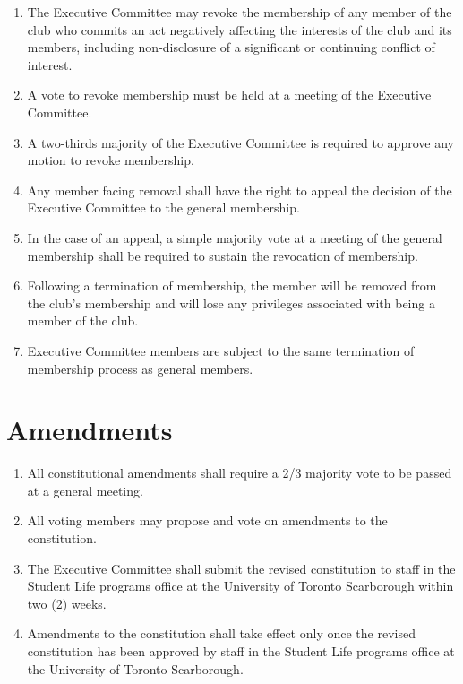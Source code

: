 \documentclass[12pt,a4paper]{article}
\begin{document}
\begin{enumerate}
\item The Executive Committee may revoke the membership of any member of the club who commits an act negatively affecting the interests of the club and its members, including non-disclosure of a significant or continuing conflict of interest.

\item A vote to revoke membership must be held at a meeting of the Executive Committee.

\item A two-thirds majority of the Executive Committee is required to approve any motion to revoke membership.

\item Any member facing removal shall have the right to appeal the decision of the Executive Committee to the general membership.

\item In the case of an appeal, a simple majority vote at a meeting of the general membership shall be required to sustain the revocation of membership.

\item Following a termination of membership, the member will be removed from the club's membership and will lose any privileges associated with being a member of the club.

\item Executive Committee members are subject to the same termination of membership process as general members.
\end{enumerate}

\section{Amendments}

\begin{enumerate}
\item All constitutional amendments shall require a 2/3 majority vote to be passed at a general meeting.

\item All voting members may propose and vote on amendments to the constitution.

\item The Executive Committee shall submit the revised constitution to staff in the Student Life programs office at the University of Toronto Scarborough within two (2) weeks.

\item Amendments to the constitution shall take effect only once the revised constitution has been approved by staff in the Student Life programs office at the University of Toronto Scarborough.
\end{enumerate}
\end{document}
